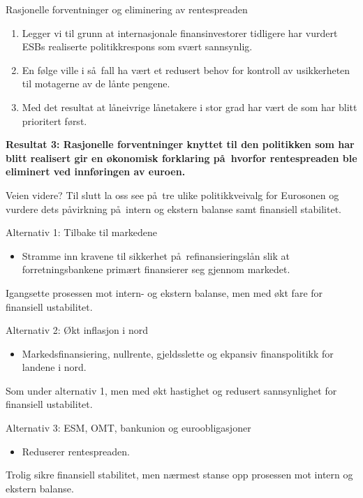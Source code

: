 \documentclass[notes=show notes]{beamer}
\begin{document}
\begin{frame}{Rasjonelle forventninger og eliminering av rentespreaden}
	\begin{enumerate}
		\item Legger vi til grunn at internasjonale finansinvestorer tidligere har vurdert
		ESBs realiserte politikkrespons som sv\ae rt sannsynlig.
		\item En f\o lge ville i s\aa \ fall ha v\ae rt et redusert behov for kontroll av usikkerheten til motagerne av de l\aa nte pengene.
		\item Med det resultat at l\aa neivrige l\aa netakere i stor grad har v\ae rt de som har blitt prioritert f\o rst.
	\end{enumerate}
\end{frame}
\begin{frame}
\textbf{Resultat 3: Rasjonelle forventninger knyttet til den politikken som har blitt realisert gir en  \o konomisk forklaring p\aa \ hvorfor rentespreaden ble eliminert ved innf\o ringen av euroen.}
\end{frame}
\begin{frame}{Veien videre?}
Til slutt la oss see p\aa \ tre ulike politikkveivalg for Eurosonen og vurdere dets p\aa virkning p\aa  \ intern og ekstern balanse samt finansiell stabilitet.
\end{frame}
\begin{frame}{Alternativ 1: Tilbake til markedene}
\begin{itemize}
	\item Stramme inn kravene til sikkerhet p\aa \ refinansieringsl\aa n  slik at forretningsbankene
	prim\ae rt finansierer seg gjennom markedet.
\end{itemize}
Igangsette prosessen mot intern- og ekstern balanse, men med \o kt fare for finansiell ustabilitet.
\end{frame}
\begin{frame}{Alternativ 2: \O kt inflasjon i nord}
\begin{itemize}
	\item Markedsfinansiering, nullrente, gjeldsslette og ekpansiv finanspolitikk for landene i nord.
\end{itemize}
Som under alternativ 1, men med \o kt hastighet og redusert sannsynlighet for finansiell ustabilitet.
\end{frame}
\begin{frame}{Alternativ 3: ESM, OMT, bankunion og euroobligasjoner}
\begin{itemize}
	\item Reduserer rentespreaden.
\end{itemize}
Trolig sikre finansiell stabilitet, men n\ae rmest stanse opp prosessen mot intern og ekstern balanse.
\end{frame}
\end{document}
